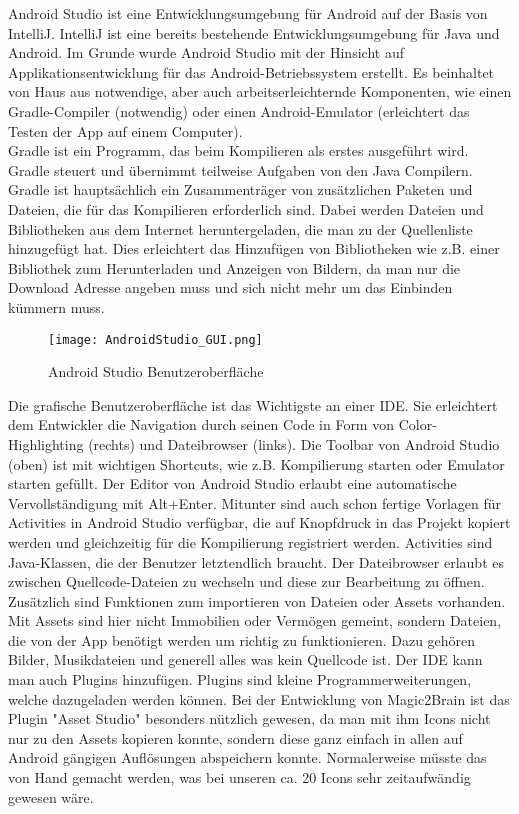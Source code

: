 Android Studio ist eine Entwicklungsumgebung für Android auf der Basis von IntelliJ.
IntelliJ ist eine bereits bestehende Entwicklungsumgebung für Java und Android.
Im Grunde wurde Android Studio mit der Hinsicht auf Applikationsentwicklung für das Android-Betriebssystem erstellt. Es beinhaltet von Haus aus notwendige, aber auch arbeitserleichternde Komponenten, wie
einen Gradle-Compiler (notwendig) oder einen Android-Emulator (erleichtert das Testen der App auf einem Computer).\\

Gradle ist ein Programm, das beim Kompilieren als erstes ausgeführt wird. Gradle steuert und übernimmt teilweise Aufgaben von den Java Compilern.
Gradle ist hauptsächlich ein Zusammenträger von zusätzlichen Paketen und Dateien, die für das Kompilieren erforderlich sind. Dabei werden Dateien und Bibliotheken aus dem Internet heruntergeladen,
die man zu der Quellenliste hinzugefügt hat. Dies erleichtert das Hinzufügen von Bibliotheken wie z.B. einer Bibliothek zum Herunterladen und Anzeigen von Bildern, da man nur die Download Adresse angeben muss
und sich nicht mehr um das Einbinden kümmern muss.

\begin{figure}[htbp]
 \centering
    \texttt{[image: AndroidStudio\_GUI.png]}
 \caption{Android Studio Benutzeroberfläche \cite{ASGUI}}
 \label{fig:Android Studio GUI}
\end{figure}
Die grafische Benutzeroberfläche ist das Wichtigste an einer IDE. Sie erleichtert dem Entwickler die Navigation durch seinen Code in Form von Color-Highlighting (rechts) und Dateibrowser (links).
Die Toolbar von Android Studio (oben) ist mit wichtigen Shortcuts, wie z.B. Kompilierung starten oder Emulator starten gefüllt.
Der Editor von Android Studio erlaubt eine automatische Vervollständigung mit Alt+Enter. Mitunter sind auch schon fertige Vorlagen für Activities in Android Studio verfügbar, die auf Knopfdruck in das Projekt kopiert werden und gleichzeitig für die Kompilierung registriert werden. Activities sind Java-Klassen, die der Benutzer letztendlich braucht. Der Dateibrowser erlaubt es zwischen Quellcode-Dateien zu wechseln und diese zur Bearbeitung zu öffnen. Zusätzlich sind Funktionen zum importieren von Dateien oder Assets vorhanden. Mit Assets sind hier nicht Immobilien oder Vermögen gemeint, sondern Dateien, die von der App benötigt werden um richtig zu funktionieren. Dazu gehören Bilder, Musikdateien und generell alles was kein Quellcode ist. Der IDE kann man auch Plugins hinzufügen. Plugins sind kleine Programmerweiterungen, welche dazugeladen werden können. Bei der Entwicklung von Magic2Brain ist das Plugin "Asset Studio" besonders nützlich gewesen, da man mit ihm Icons nicht nur zu den Assets kopieren konnte, sondern diese ganz einfach in allen auf Android gängigen Auflösungen abspeichern konnte. Normalerweise müsste das von Hand gemacht werden, was bei unseren ca. 20 Icons sehr zeitaufwändig gewesen wäre.

